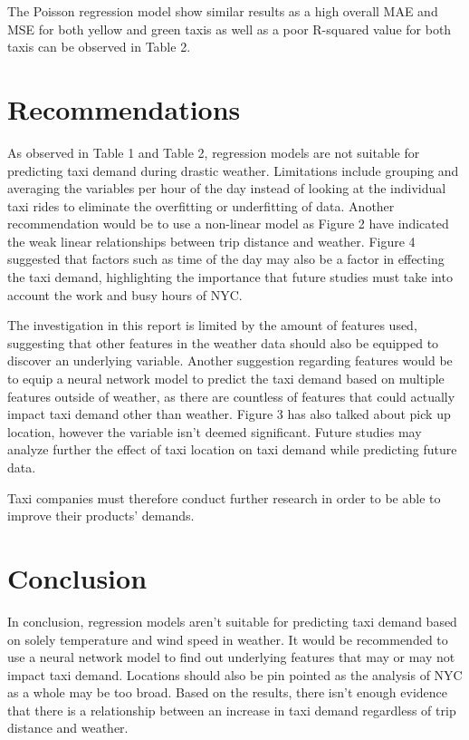 \documentclass[11pt]{article}
\begin{document}
The Poisson regression model show similar results as a high overall MAE and MSE for both yellow and green taxis as well as a poor R-squared value for both taxis can be observed in Table 2.



\section{Recommendations}
As observed in Table 1 and Table 2, regression models are not suitable for predicting taxi demand during drastic weather. Limitations include grouping and averaging the variables per hour of the day instead of looking at the individual taxi rides to eliminate the overfitting or underfitting of data. Another recommendation would be to use a non-linear model as Figure 2 have indicated the weak linear relationships between trip distance and weather. Figure 4 suggested that factors such as time of the day may also be a factor in effecting the taxi demand, highlighting the importance that future studies must take into account the work and busy hours of NYC. 

The investigation in this report is limited by the amount of features used, suggesting that other features in the weather data should also be equipped to discover an underlying variable. Another suggestion regarding features would be to equip a neural network model to predict the taxi demand based on multiple features outside of weather, as there are countless of features that could actually impact taxi demand other than weather. Figure 3 has also talked about pick up location, however the variable isn't deemed significant. Future studies may analyze further the effect of taxi location on taxi demand while predicting future data.

Taxi companies must therefore conduct further research in order to be able to improve their products' demands. 

\section{Conclusion}
In conclusion, regression models aren't suitable for predicting taxi demand based on solely temperature and wind speed in weather. It would be recommended to use a neural network model to find out underlying features that may or may not impact taxi demand. Locations should also be pin pointed as the analysis of NYC as a whole may be too broad. Based on the results, there isn't enough evidence that there is a relationship between an increase in taxi demand regardless of trip distance and weather.


\clearpage

\printbibliography
\end{document}
